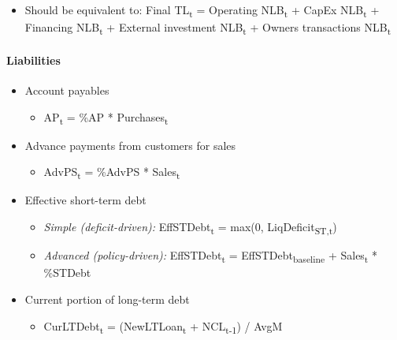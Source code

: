 \documentclass[12pt,a4paper]{article}
\begin{document}
\begin{itemize}
\begin{itemize}
    \begin{itemize}
    \item
      Cash\textsubscript{t} = TL\textsubscript{t} *
      $\sigma(\alpha_{\text{Cash}} + \beta_{\text{Cash}} \cdot t)$
    \item
      IMS\textsubscript{t} = TL\textsubscript{t} --
      Cash\textsubscript{t}
    \end{itemize}
  \item
    Should be equivalent to: Final TL\textsubscript{t} = Operating
    NLB\textsubscript{t} + CapEx NLB\textsubscript{t} + Financing
    NLB\textsubscript{t} + External investment NLB\textsubscript{t} +
    Owners transactions NLB\textsubscript{t}
  \end{itemize}
\end{itemize}

\paragraph{Liabilities}

\begin{itemize}
\item
  Account payables

  \begin{itemize}
  \item
    AP\textsubscript{t} = \%AP * Purchases\textsubscript{t}
  \end{itemize}
\item
  Advance payments from customers for sales

  \begin{itemize}
  \item
    AdvPS\textsubscript{t} = \%AdvPS * Sales\textsubscript{t}
  \end{itemize}
\item
  Effective short-term debt

  \begin{itemize}
  \item
    \textit{Simple (deficit-driven):}\;
    EffSTDebt\textsubscript{t} = max(0,
    LiqDeficit\textsubscript{ST,t})
  \item
    \textit{Advanced (policy-driven):}\;
    EffSTDebt\textsubscript{t} = EffSTDebt\textsubscript{baseline} +
    Sales\textsubscript{t} * \%STDebt
  \end{itemize}
\item
  Current portion of long-term debt

  \begin{itemize}
  \item
    CurLTDebt\textsubscript{t} = (NewLTLoan\textsubscript{t} +
    NCL\textsubscript{t-1}) / AvgM
  \end{itemize}
\end{itemize}
\end{document}
